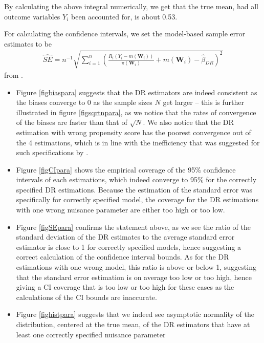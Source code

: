\documentclass[12pt,twoside]{article}
\begin{document}
By calculating the above integral numerically, we get that the true mean, had all outcome variables $Y_i$ been accounted for, is about 0.53.

For calculating the confidence intervals, we set the model-based sample error estimates to be 
\begin{align*}
    \hat{SE} = n^{-1} \sqrt{\sum_{i=1}^n \left(\frac{R_i(Y_i - m(\mathbf{W}_i))}{\pi(\mathbf{W}_i)} + m(\mathbf{W}_i) - \hat{\beta}_{DR}\right)^2}
\end{align*}
from \citet{lunceford_davidian}.

\begin{itemize}
    \item Figure \ref{figbiaspara} suggests that the DR estimators are indeed consistent as the biases converge to 0 as the sample sizes $N$ get larger -- this is further illustrated in figure \ref{figsqrtnpara}, as we notice that the rates of convergence of the biases are faster than that of $\sqrt{N}$. We also notice that the DR estimation with wrong propensity score has the poorest convergence out of the 4 estimations, which is in line with the inefficiency that was suggested for such specifications by \citet{kang}.
    \item Figure \ref{figCIpara} shows the empirical coverage of the 95\% confidence intervals of each estimations, which indeed converge to 95\% for the correctly specified DR estimations. Because the estimation of the standard error was specifically for correctly specified model, the coverage for the DR estimations with one wrong nuisance parameter are either too high or too low.
    \item Figure \ref{figSEpara} confirms the statement above, as we see the ratio of the standard deviation of the DR estimates to the average standard error estimator is close to 1 for correctly specified models, hence suggesting a correct calculation of the confidence interval bounds. As for the DR estimations with one wrong model, this ratio is above or below 1, suggesting that the standard error estimation is on average too low or too high, hence giving a CI coverage that is too low or too high for these cases as the calculations of the CI bounds are inaccurate.
    \item Figure \ref{fighistpara} suggests that we indeed see asymptotic normality of the distribution, centered at the true mean, of the DR estimators that have at least one correctly specified nuisance parameter
\end{itemize}
\end{document}
